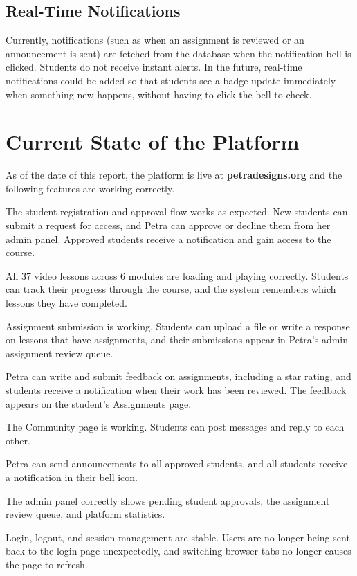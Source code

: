 \documentclass[12pt, a4paper]{article}
\begin{document}
\subsection{Real-Time Notifications}

Currently, notifications (such as when an assignment is reviewed or an announcement is sent) are fetched from the database when the notification bell is clicked. Students do not receive instant alerts. In the future, real-time notifications could be added so that students see a badge update immediately when something new happens, without having to click the bell to check.

\section{Current State of the Platform}

As of the date of this report, the platform is live at \textbf{petradesigns.org} and the following features are working correctly.

The student registration and approval flow works as expected. New students can submit a request for access, and Petra can approve or decline them from her admin panel. Approved students receive a notification and gain access to the course.

All 37 video lessons across 6 modules are loading and playing correctly. Students can track their progress through the course, and the system remembers which lessons they have completed.

Assignment submission is working. Students can upload a file or write a response on lessons that have assignments, and their submissions appear in Petra's admin assignment review queue.

Petra can write and submit feedback on assignments, including a star rating, and students receive a notification when their work has been reviewed. The feedback appears on the student's Assignments page.

The Community page is working. Students can post messages and reply to each other.

Petra can send announcements to all approved students, and all students receive a notification in their bell icon.

The admin panel correctly shows pending student approvals, the assignment review queue, and platform statistics.

Login, logout, and session management are stable. Users are no longer being sent back to the login page unexpectedly, and switching browser tabs no longer causes the page to refresh.
\end{document}
